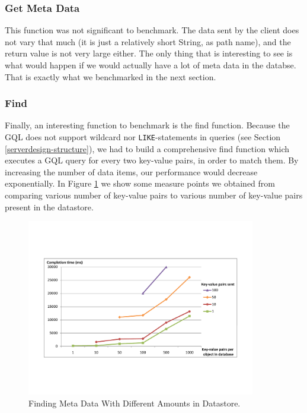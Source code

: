 \subsubsection{Get Meta Data}
This function was not significant to benchmark. The data sent by the client
does not vary that much (it is just a relatively short String, as path name),
and the return value is not very large either. The only thing that is interesting
to see is what would happen if we would actually have a lot of meta data in the
databse. That is exactly what we benchmarked in the next section.

\subsubsection{Find}
Finally, an interesting function to benchmark is the find function. Because the
GQL does not support wildcard nor \texttt{LIKE}-statements in queries (see
Section \ref{serverdesign-structure}), we had to build a comprehensive find
function which executes a GQL query for every two key-value pairs, in order to
match them. By increasing the number of data items, our performance would
decrease exponentially. In Figure \ref{find-md-amt} we show some measure points
we obtained from comparing various number of key-value pairs to various number
of key-value pairs present in the datastore.

\begin{figure} %
\begin{center}
\includegraphics[trim=5cm 4cm 5cm 5cm,width=10cm]{./figures/find_amt.pdf}
\caption{Finding Meta Data With Different Amounts in Datastore.
\label{find-md-amt}}
\end{center}
\end{figure}

